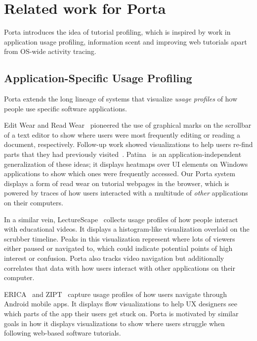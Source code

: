 \section{Related work for Porta}

Porta introduces the idea of tutorial profiling, which is inspired by
work in application usage profiling, information scent and improving web
tutorials apart from OS-wide activity tracing.

\subsection{Application-Specific Usage Profiling}

Porta extends the long lineage of systems that visualize \emph{usage
profiles} of how people use specific software applications.

Edit Wear and Read Wear~\cite{Hill1992} pioneered the use of graphical
marks on the scrollbar of a text editor to show where users were most
frequently editing or reading a document, respectively. Follow-up work
showed visualizations to help users re-find parts that they had
previously visited~\cite{Alexander2009}.
%
Patina~\cite{Matejka2013patina} is an application-independent
generalization of these ideas; it displays heatmaps over UI elements on
Windows applications to show which ones were frequently accessed.
%
Our Porta system displays a form of read wear on tutorial webpages in
the browser, which is powered by traces of how users
interacted with a multitude of \emph{other} applications on their computers.


In a similar vein, LectureScape~\cite{KimUIST2014} collects usage
profiles of how people interact with educational videos. It displays a
histogram-like visualization overlaid on the scrubber timeline. Peaks in
this visualization represent where lots of viewers either paused or
navigated to, which could indicate potential points of high interest or
confusion. Porta also tracks video navigation but additionally
correlates that data with how users interact with other applications on
their computer.

ERICA~\cite{Deka2016} and ZIPT~\cite{Deka2017} capture usage profiles of
how users navigate through Android mobile apps. It displays flow
visualizations to help UX designers see which parts of the app their
users get stuck on. Porta is motivated by similar goals in how it
displays visualizations to show where users struggle when following
web-based software tutorials.

